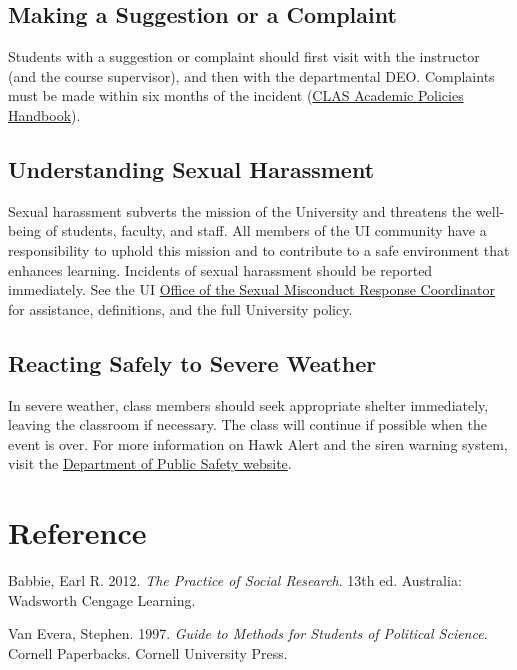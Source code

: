 \documentclass[11pt,]{article}
\theoremstyle{definition}
\theoremstyle{definition}
\theoremstyle{remark}
\begin{document}
\subsection{Making a Suggestion or a
Complaint}\label{making-a-suggestion-or-a-complaint}

Students with a suggestion or complaint should first visit with the
instructor (and the course supervisor), and then with the departmental
DEO. Complaints must be made within six months of the incident
(\href{https://clas.uiowa.edu/students/handbook}{CLAS Academic Policies
Handbook}).

\subsection{Understanding Sexual
Harassment}\label{understanding-sexual-harassment}

Sexual harassment subverts the mission of the University and threatens
the well-being of students, faculty, and staff. All members of the UI
community have a responsibility to uphold this mission and to contribute
to a safe environment that enhances learning. Incidents of sexual
harassment should be reported immediately. See the UI
\href{https://osmrc.uiowa.edu/}{Office of the Sexual Misconduct Response
Coordinator} for assistance, definitions, and the full University
policy.

\subsection{Reacting Safely to Severe
Weather}\label{reacting-safely-to-severe-weather}

In severe weather, class members should seek appropriate shelter
immediately, leaving the classroom if necessary. The class will continue
if possible when the event is over. For more information on Hawk Alert
and the siren warning system, visit the
\href{https://police.uiowa.edu/emergency-communications}{Department of
Public Safety website}.

\clearpage

\section*{Reference}\label{reference}

\hypertarget{refs}{}
\hypertarget{ref-Babbie2012}{}
Babbie, Earl R. 2012. \emph{The Practice of Social Research}. 13th ed.
Australia: Wadsworth Cengage Learning.

\hypertarget{ref-VanEvera1997}{}
Van Evera, Stephen. 1997. \emph{Guide to Methods for Students of
Political Science}. Cornell Paperbacks. Cornell University Press.



\clearpage
\end{document}
